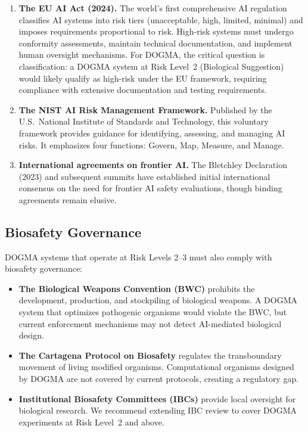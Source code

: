 \begin{enumerate}[leftmargin=1.8em]
  \item \textbf{The EU AI Act (2024).} The world's first comprehensive AI regulation classifies AI systems into risk tiers (unacceptable, high, limited, minimal) and imposes requirements proportional to risk.
  High-risk systems must undergo conformity assessments, maintain technical documentation, and implement human oversight mechanisms.
  For DOGMA, the critical question is classification: a DOGMA system at Risk Level~2 (Biological Suggestion) would likely qualify as high-risk under the EU framework, requiring compliance with extensive documentation and testing requirements.

  \item \textbf{The NIST AI Risk Management Framework.} Published by the U.S.\ National Institute of Standards and Technology, this voluntary framework provides guidance for identifying, assessing, and managing AI risks.
  It emphasizes four functions: Govern, Map, Measure, and Manage.

  \item \textbf{International agreements on frontier AI.} The Bletchley Declaration (2023) and subsequent summits have established initial international consensus on the need for frontier AI safety evaluations, though binding agreements remain elusive.
\end{enumerate}

\subsection{Biosafety Governance}

DOGMA systems that operate at Risk Levels 2--3 must also comply with biosafety governance:

\begin{itemize}[leftmargin=1.5em]
  \item \textbf{The Biological Weapons Convention (BWC)} prohibits the development, production, and stockpiling of biological weapons.
  A DOGMA system that optimizes pathogenic organisms would violate the BWC, but current enforcement mechanisms may not detect AI-mediated biological design.
  \item \textbf{The Cartagena Protocol on Biosafety} regulates the transboundary movement of living modified organisms.
  Computational organisms designed by DOGMA are not covered by current protocols, creating a regulatory gap.
  \item \textbf{Institutional Biosafety Committees (IBCs)} provide local oversight for biological research.
  We recommend extending IBC review to cover DOGMA experiments at Risk Level~2 and above.
\end{itemize}

